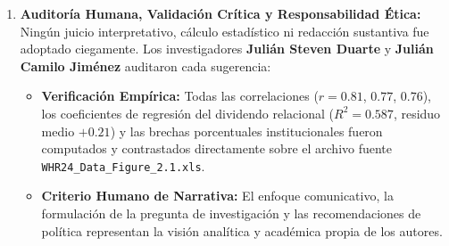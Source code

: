 \documentclass[9.5pt, a4paper]{article}
\begin{document}
\begin{enumerate}
    \item \textbf{Auditoría Humana, Validación Crítica y Responsabilidad Ética:}  
    Ningún juicio interpretativo, cálculo estadístico ni redacción sustantiva fue adoptado ciegamente. Los investigadores \textbf{Julián Steven Duarte} y \textbf{Julián Camilo Jiménez} auditaron cada sugerencia:
    \begin{itemize}
        \item \textbf{Verificación Empírica:} Todas las correlaciones ($r = 0.81$, $0.77$, $0.76$), los coeficientes de regresión del dividendo relacional ($R^2 = 0.587$, residuo medio $+0.21$) y las brechas porcentuales institucionales fueron computados y contrastados directamente sobre el archivo fuente \texttt{WHR24\_Data\_Figure\_2.1.xls}.
        \item \textbf{Criterio Humano de Narrativa:} El enfoque comunicativo, la formulación de la pregunta de investigación y las recomendaciones de política representan la visión analítica y académica propia de los autores.
    \end{itemize}
\end{enumerate}
\end{document}
